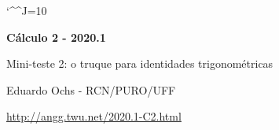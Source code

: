 \documentclass[oneside,12pt]{article}
\begin{document}
\catcode`\^^J=10


\long{}
\long{}
\long{}
\long{}
\long{}
\long{}
\long{}
\long{}
\long{}
\long{}

\long{}
\long{}

\def\frown{\ensuremath{{=}{(}}}
\def\True {\mathbf{V}}
\def\False{\mathbf{F}}
\def\D    {\displaystyle}

\def\drafturl{http://angg.twu.net/LATEX/2020-1-C2.pdf}
\def\drafturl{http://angg.twu.net/2020.1-C2.html}
\def\draftfooter{\tiny \href{\drafturl}{\jobname{}} \ColorBrown{\shorttoday{} \hours}}



%

\thispagestyle{empty}

\begin{center}

\vspace*{1.2cm}

{\bf \Large Cálculo 2 - 2020.1}

\bsk

Mini-teste 2: o truque para identidades trigonométricas


\bsk

Eduardo Ochs - RCN/PURO/UFF

\url{http://angg.twu.net/2020.1-C2.html}

\end{center}
\end{document}
